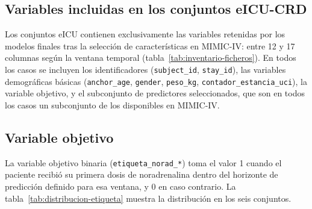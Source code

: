 \documentclass[
  spanish,
  a4paper,
  12pt,
  twoside]{memoir}
\begin{document}
\subsection*{Variables incluidas en los conjuntos eICU-CRD}
 
Los conjuntos eICU contienen exclusivamente las variables retenidas por los modelos finales tras la selección de características en MIMIC-IV: entre 12 y 17 columnas según la ventana temporal (tabla~\ref{tab:inventario-ficheros}). En todos los casos se incluyen los identificadores (\texttt{subject\_id}, \texttt{stay\_id}), las variables demográficas básicas (\texttt{anchor\_age}, \texttt{gender}, \texttt{peso\_kg}, \texttt{contador\_estancia\_uci}), la variable objetivo, y el subconjunto de predictores seleccionados, que son en todos los casos un subconjunto de los disponibles en MIMIC-IV.
 
\subsection*{Variable objetivo}
 
La variable objetivo binaria (\texttt{etiqueta\_norad\_*}) toma el valor 1 cuando el paciente recibió su primera dosis de noradrenalina dentro del horizonte de predicción definido para esa ventana, y 0 en caso contrario. La tabla~\ref{tab:distribucion-etiqueta} muestra la distribución en los seis conjuntos.
 
\begin{table}[htbp]
  \centering
  \caption{Distribución de la variable objetivo en los seis conjuntos definitivos.}
  \label{tab:distribucion-etiqueta}
\end{table}
 
\end{document}
